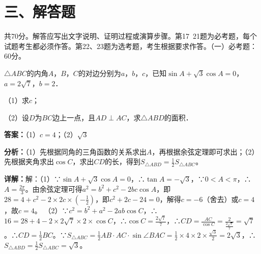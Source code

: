 \section*{三、解答题}
共70分。解答应写出文字说明、证明过程或演算步骤。第17~21题为必考题，每个试题考生都必须作答。第22、23题为选考题，考生根据要求作答。（一）必考题：60分。

\begin{question}[points=12]
$\triangle ABC$的内角$A$，$B$，$C$的对边分别为$a$，$b$，$c$，已知$\sin A+\sqrt{3}\cos A=0$，$a=2\sqrt{7}$，$b=2$．

（1）求$c$；

（2）设$D$为$BC$边上一点，且$AD\perp AC$，求$\triangle ABD$的面积．
\begin{solution}
\textbf{答案：}（1）$c=4$；（2）$\sqrt{3}$

\textbf{分析：}（1）先根据同角的三角函数的关系求出$A$，再根据余弦定理即可求出；（2）先根据夹角求出$\cos C$，求出$CD$的长，得到$S_{\triangle ABD}=\frac{1}{2}S_{\triangle ABC}$。

\textbf{详解：}解：（1）∵$\sin A+\sqrt{3}\cos A=0$，∴$\tan A=-\sqrt{3}$，∵$0<A<\pi$，∴$A=\frac{2\pi}{3}$。由余弦定理可得$a^2=b^2+c^2-2bc\cos A$，即$28=4+c^2-2\times2c\times(-\frac{1}{2})$，即$c^2+2c-24=0$，解得$c=-6$（舍去）或$c=4$，故$c=4$。
（2）∵$c^2=b^2+a^2-2ab\cos C$，∴$16=28+4-2\times2\sqrt{7}\times2\times\cos C$，∴$\cos C=\frac{2\sqrt{7}}{7}$，∴$CD=\frac{AC}{\cos C}=\frac{2}{\frac{2\sqrt{7}}{7}}=\sqrt{7}$。∴$CD=\frac{1}{2}BC$。∵$S_{\triangle ABC}=\frac{1}{2}AB\cdot AC\cdot\sin\angle BAC=\frac{1}{2}\times4\times2\times\frac{\sqrt{3}}{2}=2\sqrt{3}$，∴$S_{\triangle ABD}=\frac{1}{2}S_{\triangle ABC}=\sqrt{3}$。
\end{solution}
\end{question}

